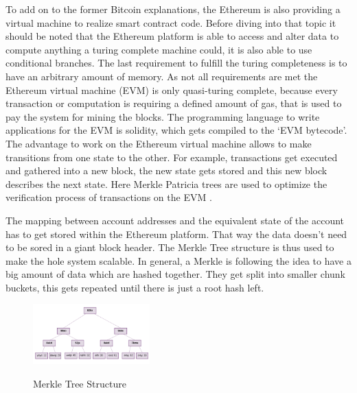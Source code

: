To add on to the former Bitcoin explanations, the Ethereum is also providing a virtual machine to realize smart contract code. 
Before diving into that topic it should be noted that the Ethereum platform is able to access and alter data to compute anything a turing complete machine could, it is also able to use conditional branches. 
The last requirement to fulfill the turing completeness is to have an arbitrary amount of memory. 
As not all requirements are met the Ethereum virtual machine (EVM) is only quasi-turing complete, because every transaction or computation is requiring a defined amount of gas, that is used to pay the system for mining the blocks. 
The programming language to write applications for the EVM is solidity, which gets compiled to the ‘EVM bytecode’. 
The advantage to work on the Ethereum virtual machine allows to make transitions from one state to the other. For example, transactions get executed and gathered into a new block, the new state gets stored and this new block describes the next state.
Here Merkle Patricia trees are used to optimize the verification process of transactions on the EVM \cite{Bisade2018}.

The mapping between account addresses and the equivalent state of the account has to get stored within the Ethereum platform. That way the data doesn’t need to be sored in a giant block header.
The Merkle Tree structure is thus used to make the hole system scalable. 
In general, a Merkle is following the idea to have a big amount of data which are hashed together. 
They get split into smaller chunk buckets, this gets repeated until there is just a root hash left. \cite{Butin2015}

\begin{figure}[ht]
\centering 
\caption{Merkle Tree Structure}
\cite{preethi}
\includegraphics[width=0.4\textwidth]{MerkleTree1}
\end{figure}

